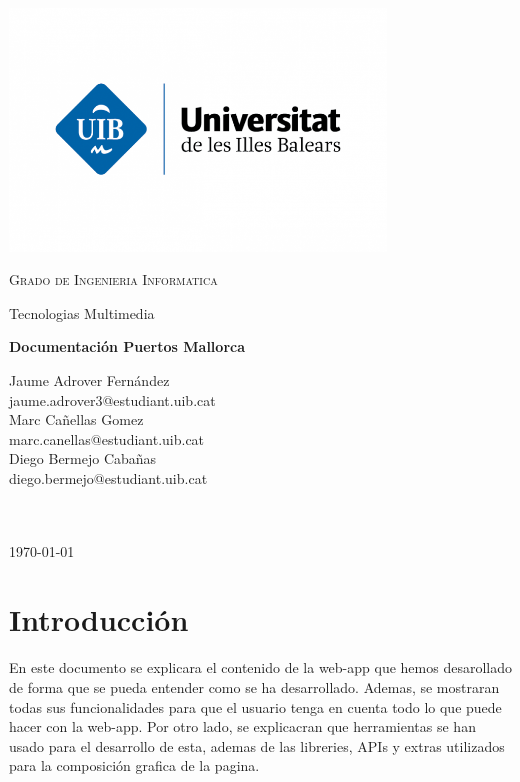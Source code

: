 \documentclass{article}
\begin{document}
\begin{titlepage}
    \centering
    \includegraphics[width=0.75\textwidth]{images/uib.png}\par\vspace{1cm}
    {\scshape\LARGE Grado de Ingenieria Informatica \par}
    \vspace{1cm}
    {\Large Tecnologias Multimedia \par}
    \vspace{1.5cm}
    {\huge\bfseries Documentación Puertos Mallorca\par}
    \vspace{2cm}
    {\large
    Jaume Adrover Fernández \\
    jaume.adrover3@estudiant.uib.cat \\
    \vspace{0.5cm}
    Marc Cañellas Gomez \\
    marc.canellas@estudiant.uib.cat \\
    \vspace{0.5cm}
    Diego Bermejo Cabañas \\
    diego.bermejo@estudiant.uib.cat \\
    \vspace{0.5cm}
    \textit{}\\
    \texttt{}
    \par}
    \vfill

    {\large \texttt{} \\\today\par}
\end{titlepage}

\newpage
\hypersetup{linkcolor=black}
\tableofcontents
\newpage

\section{Introducción}
En este documento se explicara el contenido de la web-app que hemos desarollado de forma que se pueda entender como se ha desarrollado. Ademas, se mostraran todas sus funcionalidades para que el usuario tenga en cuenta todo lo que puede hacer con la web-app. Por otro lado, se explicacran que herramientas se han usado para el desarrollo de esta, ademas de las libreries, APIs y extras utilizados para la composición grafica de la pagina.
\end{document}
